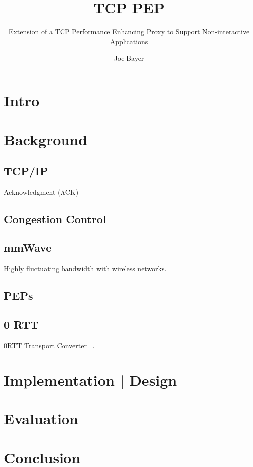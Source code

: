 \documentclass[a4paper,english, 11pt]{report}
\author{Joe Bayer}
\title{TCP PEP}
\subtitle{Extension of a TCP Performance Enhancing Proxy to
Support Non-interactive Applications}
\begin{document}
\uiomasterfp[program={Informatikk: programmering og systemarkitektur}, supervisor={Michael Welzl}]

\tableofcontents

\chapter{Intro}

\chapter{Background}

\section{TCP/IP}

Acknowledgment (ACK) 

\section{Congestion Control}

\section{mmWave}
Highly fluctuating bandwidth with wireless networks.
\section{PEPs}

\section{0 RTT}

0RTT Transport Converter ~\cite{rfc8803}.


\chapter{Implementation | Design}
\chapter{Evaluation}
\chapter{Conclusion}

{}

\end{document}
